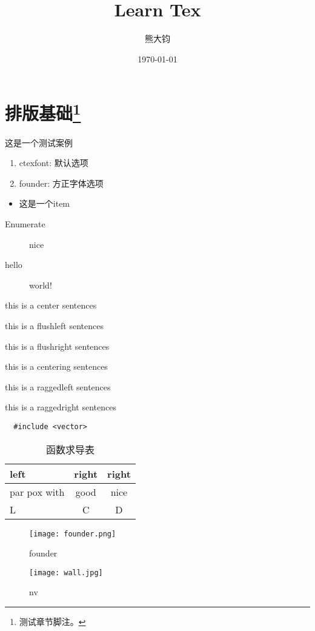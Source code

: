 \documentclass[cn,hazy,blue,11pt,screen]{elegantnote}
\title{Learn Tex}
\author{熊大钧}
\date{\today}
\begin{document}
  \maketitle
\tableofcontents

\section{排版基础\footnote{测试章节脚注。}}
这是一个测试案例
\begin{enumerate}
  \item ctexfont: 默认选项
  \item founder: 方正字体选项
\end{enumerate}
\begin{itemize}
  \item 这是一个item
\end{itemize}
\begin{description}
  \item[Enumerate] nice 
  \item[hello] world!
\end{description}
\begin{center}
    this is a center sentences
\end{center}
\begin{flushleft}
  this is a flushleft sentences
\end{flushleft}
\begin{flushright}
  this is a flushright sentences
\end{flushright}
\centering
this is a centering sentences

\raggedleft
this is a raggedleft sentences

\raggedright
this is a raggedright sentences
\begin{verbatim}
  #include <vector>
\end{verbatim}
\begin{table}[htbp]
  \centering
  \small
  \caption {函数求导表}
  \begin{tabular}{|l|c|c|}
    \hline
    left & right & right \\ 
    \hline
    par pox with & good & nice \\
    \hline
    L   & C & D \\
    \hline
  \end{tabular}
\end{table}
\begin{figure}[htbp]
  \centering
  \begin{minipage}{20em}
    \centering
    \texttt{[image: founder.png]}
    \caption{founder}
  \end{minipage}
  \begin{minipage}{20em}
    \centering
    \texttt{[image: wall.jpg]}
    \caption{nv}
  \end{minipage}
\end{figure}
\listoffigures
{}
\end{document}
